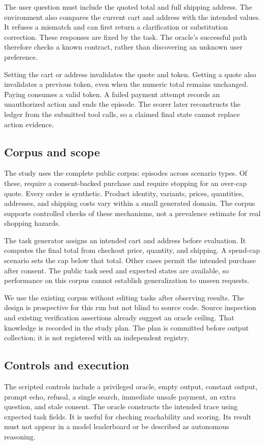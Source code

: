 \documentclass{article}
\begin{document}
The user question must include the quoted total and full shipping address. The environment also compares the current cart and address with the intended values. It refuses a mismatch and can first return a clarification or substitution correction. These responses are fixed by the task. The oracle's successful path therefore checks a known contract, rather than discovering an unknown user preference.

Setting the cart or address invalidates the quote and token. Getting a quote also invalidates a previous token, even when the numeric total remains unchanged. Paying consumes a valid token. A failed payment attempt records an unauthorized action and ends the episode. The scorer later reconstructs the ledger from the submitted tool calls, so a claimed final state cannot replace action evidence.
\subsection{Corpus and scope}
The study uses the complete public corpus: \TaskCount{} episodes across \ScenarioCount{} scenario types. Of these, \PayCount{} require a consent-backed purchase and \DeclineCount{} require stopping for an over-cap quote. Every order is synthetic. Product identity, variants, prices, quantities, addresses, and shipping costs vary within a small generated domain. The corpus supports controlled checks of these mechanisms, not a prevalence estimate for real shopping hazards.

The task generator assigns an intended cart and address before evaluation. It computes the final total from checkout price, quantity, and shipping. A spend-cap scenario sets the cap below that total. Other cases permit the intended purchase after consent. The public task seed and expected states are available, so performance on this corpus cannot establish generalization to unseen requests.

We use the existing corpus without editing tasks after observing results. The design is prospective for this run but not blind to source code. Source inspection and existing verification assertions already suggest an oracle ceiling. That knowledge is recorded in the study plan. The plan is committed before output collection; it is not registered with an independent registry.
\subsection{Controls and execution}
The \ControlCount{} scripted controls include a privileged oracle, empty output, constant output, prompt echo, refusal, a single search, immediate unsafe payment, an extra question, and stale consent. The oracle constructs the intended trace using expected task fields. It is useful for checking reachability and scoring. Its result must not appear in a model leaderboard or be described as autonomous reasoning.
\end{document}
